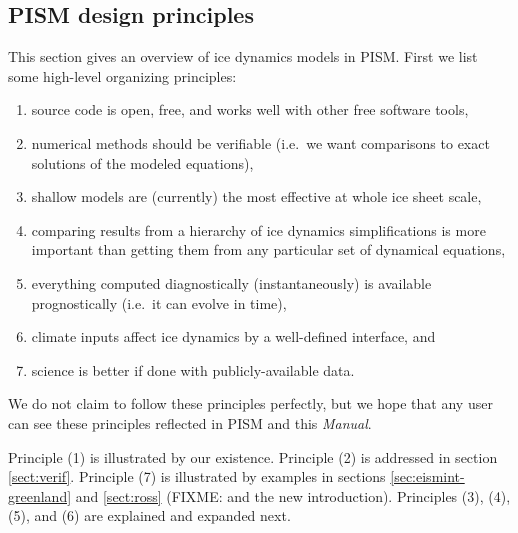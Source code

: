\documentclass[11pt,final]{amsart}
\begin{document}
\subsection{PISM design principles}  This section gives an overview of ice dynamics models in PISM.  First we list some high-level organizing principles:
\begin{enumerate}
\item source code is open, free, and works well with other free software tools,
\item numerical methods should be verifiable (i.e.~we want comparisons to exact solutions of the modeled equations),
\item shallow models are (currently) the most effective at whole ice sheet scale,
\item comparing results from a hierarchy of ice dynamics simplifications is more important than getting them from any particular set of dynamical equations,
\item everything computed diagnostically (instantaneously) is available prognostically (i.e.~it can evolve in time),
\item climate inputs affect ice dynamics by a well-defined interface, and
\item science is better if done with publicly-available data.
\end{enumerate}

\noindent We do not claim to follow these principles perfectly, but we hope that any user can see these principles reflected in PISM and this \emph{Manual}.

Principle (1) is illustrated by our existence.  Principle (2) is addressed in section \ref{sect:verif}.  Principle (7) is illustrated by examples in sections \ref{sec:eismint-greenland} and \ref{sect:ross} (FIXME: and the new introduction).  Principles (3), (4), (5), and (6) are explained and expanded next.
\end{document}
